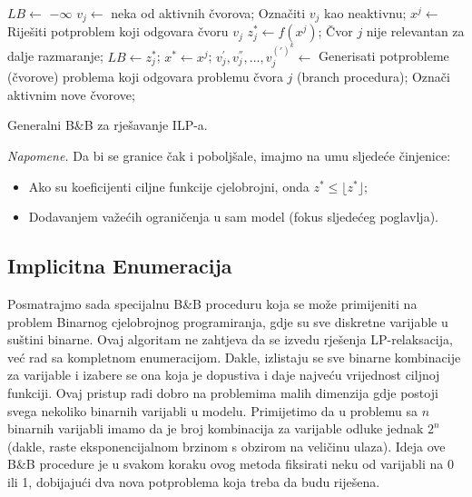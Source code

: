 \documentclass[a4paper, utf8, 11pt, colorlinks]{article}
\begin{document}
\begin{algorithm}[H] 
	\begin{algorithmic}
		\STATE $LB \gets$ $-\infty$
		\STATE  $v_j \gets$ neka od aktivnih čvorova;
		\STATE  Označiti $v_j$ kao neaktivnu;
		\STATE  $x^j \gets$ Riješiti potproblem koji odgovara čvoru $v_j$
		\STATE $z^*_j \gets f(x^j)$;
		\STATE Čvor $j$ nije relevantan za dalje razmaranje; 
		\ENDIF
		\STATE $LB \gets z^*_j$;
		\STATE $x^* \gets x^j$;
		\ENDIF
		\ENDIF
		\STATE $v_j^{'}, v_j^{''},\ldots, v_j^{(')^k}  \gets$ Generisati potprobleme (čvorove) problema koji odgovara problemu čvora $j$ (branch procedura);
		\STATE Označi aktivnim nove čvorove; 
		\ENDIF
		\ENDIF
		\ENDWHILE
	\end{algorithmic}
	\caption{Generalni B\&B za rješavanje ILP-a.}\label{bnb_algorithm_ilp}
\end{algorithm}

\emph{Napomene.} Da bi se granice čak i poboljšale, imajmo na umu sljedeće činjenice:
\begin{itemize}
	\item Ako su koeficijenti ciljne funkcije cjelobrojni, onda $z^* \leq \lfloor z^* \rfloor$;
	\item Dodavanjem važećih ograničenja u sam model (fokus sljedećeg poglavlja). 
\end{itemize}



\subsection{Implicitna Enumeracija}
Posmatrajmo sada specijalnu B\&B proceduru koja se može primijeniti na problem Binarnog cjelobrojnog programiranja, gdje su sve diskretne varijable u suštini binarne. Ovaj algoritam ne zahtjeva da se izvedu rješenja LP-relaksacija, već rad sa kompletnom enumeracijom. Dakle, izlistaju se sve binarne kombinacije za varijable i izabere se ona koja je dopustiva i daje najveću vrijednost ciljnoj funkciji. Ovaj pristup radi dobro na problemima malih dimenzija gdje postoji svega nekoliko binarnih varijabli u modelu. Primijetimo da u problemu sa $n$ binarnih varijabli imamo da je broj kombinacija za varijable odluke jednak $2^n$ (dakle, raste eksponencijalnom brzinom s obzirom na veličinu ulaza). Ideja ove B\&B procedure je u svakom koraku ovog metoda fiksirati neku od varijabli na 0 ili 1, dobijajući dva nova potproblema koja treba da budu riješena. 
\end{document}
